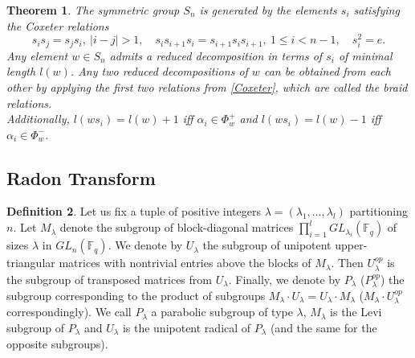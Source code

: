 \documentclass[12pt,reqno]{amsart}
\newtheorem{thm}{Theorem}[section]
\theoremstyle{definition}
\newtheorem{defn}[thm]{Definition}
\theoremstyle{remark}
\numberwithin{equation}{section}
\begin{document}
\begin{thm}\label{reduced_decomposition}
    The symmetric group $S_n$ is generated by the elements $s_i$ satisfying the Coxeter relations
    \begin{equation}\label{Coxeter}
        s_is_j=s_js_i, \ |i-j|>1, \quad s_is_{i+1}s_i=s_{i+1}s_is_{i+1},\ 1\le i<n-1, \quad s_i^2=e.
    \end{equation}
    Any element $w\in S_n$ admits a reduced decomposition in terms of $s_i$ of minimal length $l(w)$. Any two reduced decompositions of $w$ can be obtained from each other by applying the first two relations from \eqref{Coxeter}, which are called the braid relations.\\
    
    Additionally, $l(ws_i) = l(w)+1$ iff $\alpha_i \in \Phi_w^+$ and $l(ws_i) = l(w)-1$ iff $\alpha_i \in \Phi_w^-$.
\end{thm}
\subsection{Radon Transform}

\begin{defn}
    Let us fix a tuple of positive integers $\lambda=(\lambda_1,\dots, \lambda_l)$ partitioning $n$. Let $M_{\lambda}$ denote the subgroup of block-diagonal matrices $\prod_{i=1}^l GL_{\lambda_i}(\mathbb{F}_q)$ of sizes $\lambda$ in $GL_{n}(\mathbb{F}_q)$. We denote by $U_{\lambda}$ the subgroup of unipotent upper-triangular matrices with nontrivial entries above the blocks of $M_{\lambda}$. Then $U_{\lambda}^{op}$ is the subgroup of transposed matrices from $U_{\lambda}$. Finally, we denote by $P_{\lambda}$ ($P_{\lambda}^{op}$) the subgroup corresponding to the product of subgroups $M_{\lambda}\cdot U_{\lambda}=U_{\lambda} \cdot M_{\lambda}$ ($M_{\lambda}\cdot U_{\lambda}^{op}$ correspondingly). We call $P_{\lambda}$ a parabolic subgroup of type $\lambda$, $M_{\lambda}$ is the Levi subgroup of $P_{\lambda}$ and $U_{\lambda}$ is the unipotent radical of $P_{\lambda}$ (and the same for the opposite subgroups).
\end{defn}
\end{document}
